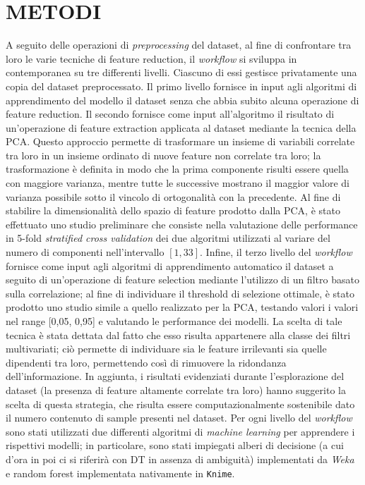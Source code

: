 \section{METODI}
A seguito delle operazioni di \textit{preprocessing} del dataset, al fine di confrontare tra loro le varie tecniche di feature reduction, il \textit{workflow} si sviluppa in contemporanea su tre differenti livelli.
Ciascuno di essi gestisce privatamente una copia del dataset preprocessato.
Il primo livello fornisce in input agli algoritmi di apprendimento del modello il dataset senza che abbia subito alcuna operazione di feature reduction.
Il secondo fornisce come input all'algoritmo il risultato di un'operazione di feature extraction applicata al dataset mediante la tecnica della PCA. Questo approccio permette di trasformare un insieme di variabili correlate tra loro in un insieme ordinato di nuove feature non correlate tra loro; la trasformazione è definita in modo che la prima componente risulti essere quella con maggiore varianza, mentre tutte le successive mostrano il maggior valore di varianza possibile sotto il vincolo di ortogonalità con la precedente.
Al fine di stabilire la dimensionalità dello spazio di feature prodotto dalla PCA, è stato effettuato uno studio preliminare che consiste nella valutazione delle performance in 5-fold \textit{stratified cross validation} dei due algoritmi utilizzati al variare del numero di componenti nell'intervallo $[1, 33]$.
Infine, il terzo livello del \textit{workflow} fornisce come input agli algoritmi di apprendimento automatico il dataset a seguito di un'operazione di feature selection mediante l'utilizzo di un filtro basato sulla correlazione; al fine di individuare il threshold di selezione ottimale, è stato prodotto uno studio simile a quello realizzato per la PCA, testando valori i valori nel range [0,05, 0,95] e valutando le performance dei modelli.
La scelta di tale tecnica è stata dettata dal fatto che esso risulta appartenere alla classe dei filtri multivariati; ciò permette di individuare sia le feature irrilevanti sia quelle dipendenti tra loro, permettendo così di rimuovere la ridondanza dell'informazione. 
In aggiunta, i risultati evidenziati durante l'esplorazione del dataset (la presenza di feature altamente correlate tra loro) hanno suggerito la scelta di questa strategia, che risulta essere computazionalmente sostenibile dato il numero contenuto di sample presenti nel dataset.
Per ogni livello del \textit{workflow} sono stati utilizzati due differenti algoritmi di \textit{machine learning} per apprendere i rispettivi modelli; in particolare, sono stati impiegati alberi di decisione (a cui d'ora in poi ci si riferirà con DT in assenza di ambiguità) implementati da \textit{Weka} e random forest implementata nativamente in \texttt{Knime}.
